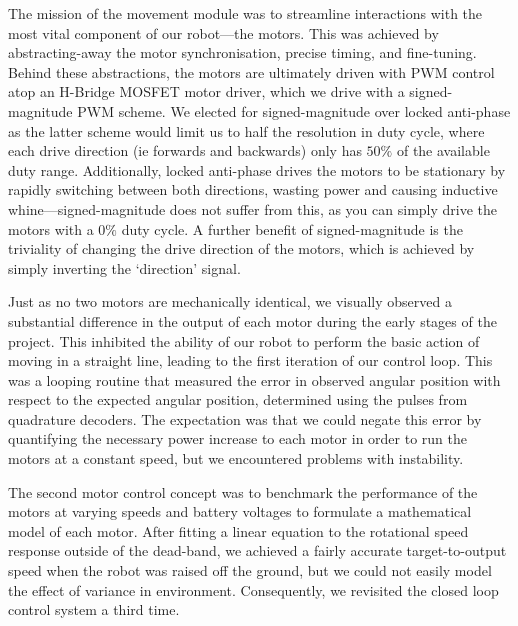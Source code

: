 \documentclass[conference]{IEEEtran}
\begin{document}
The mission of the movement module was to streamline interactions with the most vital component of our robot—the motors.
This was achieved by abstracting-away the motor synchronisation, precise timing, and fine-tuning.
Behind these abstractions, the motors are ultimately driven with PWM control atop an H-Bridge MOSFET motor driver, which we drive with a signed-magnitude PWM scheme.
We elected for signed-magnitude over locked anti-phase as the latter scheme would limit us to half the resolution in duty cycle, where each drive direction (ie forwards and backwards) only has $50\%$ of the available duty range.
Additionally, locked anti-phase drives the motors to be stationary by rapidly switching between both directions, wasting power and causing inductive whine—signed-magnitude does not suffer from this, as you can simply drive the motors with a $0\%$ duty cycle.
A further benefit of signed-magnitude is the triviality of changing the drive direction of the motors, which is achieved by simply inverting the `direction' signal.

Just as no two motors are mechanically identical, we visually observed a substantial difference in the output of each motor during the early stages of the project.
This inhibited the ability of our robot to perform the basic action of moving in a straight line, leading to the first iteration of our control loop.
This was a looping routine that measured the error in observed angular position with respect to the expected angular position, determined using the pulses from quadrature decoders.
The expectation was that we could negate this error by quantifying the necessary power increase to each motor in order to run the motors at a constant speed, but we encountered problems with instability.

The second motor control concept was to benchmark the performance of the motors at varying speeds and battery voltages to formulate a mathematical model of each motor.
After fitting a linear equation to the rotational speed response outside of the dead-band, we achieved a fairly accurate target-to-output speed when the robot was raised off the ground, but we could not easily model the effect of variance in environment.
Consequently, we revisited the closed loop control system a third time.
\end{document}
